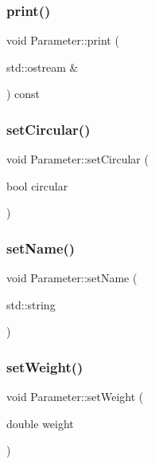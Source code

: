 \mbox{\label{class_parameter_a93bd0debbfe144b2c1dd68aca79adfb2}} 
\subsubsection{\texorpdfstring{print()}{print()}}
{\footnotesize\ttfamily void Parameter\+::print (\begin{DoxyParamCaption}\item[{std\+::ostream \&}]{ }\end{DoxyParamCaption}) const}

\mbox{\label{class_parameter_a77543a69497a6da692c76707207a6562}} 
\subsubsection{\texorpdfstring{set\+Circular()}{setCircular()}}
{\footnotesize\ttfamily void Parameter\+::set\+Circular (\begin{DoxyParamCaption}\item[{bool}]{circular }\end{DoxyParamCaption})}

\mbox{\label{class_parameter_af399de059c88d2ae0b27afd3cb998261}} 
\subsubsection{\texorpdfstring{set\+Name()}{setName()}}
{\footnotesize\ttfamily void Parameter\+::set\+Name (\begin{DoxyParamCaption}\item[{std\+::string}]{ }\end{DoxyParamCaption})}

\mbox{\label{class_parameter_ad0682af0270bd689cfa0e571dd58138d}} 
\subsubsection{\texorpdfstring{set\+Weight()}{setWeight()}}
{\footnotesize\ttfamily void Parameter\+::set\+Weight (\begin{DoxyParamCaption}\item[{double}]{weight }\end{DoxyParamCaption})}



